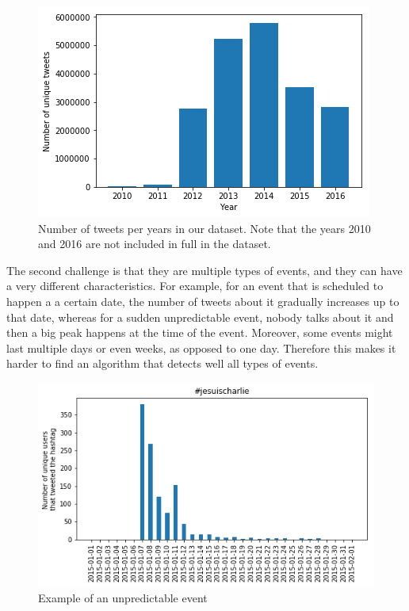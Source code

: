 \documentclass[11pt]{article}
\begin{document}
\begin{figure}[htbp]
  \vspace*{-1mm}
  \centering
  \includegraphics[width=\columnwidth]{figures/tweets_years.png}
  \vspace{-5mm}
  \caption{Number of tweets per years in our dataset. Note that the years 2010 and 2016 are not included in full in the dataset.}
  \label{fig:tweets_year}
\end{figure}

The second challenge is that they are multiple types of events, and they can have a very different characteristics. For example, for an event that is scheduled to happen a a certain date, the number of tweets about it gradually increases up to that date, whereas for a sudden unpredictable event, nobody talks about it and then a big peak happens at the time of the event. Moreover, some events might last multiple days or even weeks, as opposed to one day. Therefore this makes it harder to find an algorithm that detects well all types of events.

\begin{figure}[htbp]
  \vspace*{-1mm}
  \centering
  \includegraphics[width=\columnwidth]{figures/freq_event_type1.png}
  \vspace{-5mm}
  \caption{Example of an unpredictable event}
  \label{fig:unpredictable_event}
\end{figure}
\end{document}
